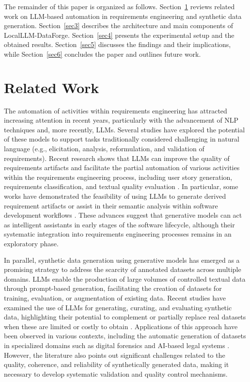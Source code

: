 \documentclass[pdflatex,sn-mathphys-num]{sn-jnl}%
\theoremstyle{thmstyleone}%
\theoremstyle{thmstyletwo}%
\theoremstyle{thmstylethree}%
\begin{document}
The remainder of this paper is organized as follows. Section~\ref{sec2} reviews related work on LLM-based automation in requirements engineering and synthetic data generation. Section~\ref{sec3} describes the architecture and main components of LocalLLM-DataForge. Section~\ref{sec4} presents the experimental setup and the obtained results. Section~\ref{sec5} discusses the findings and their implications, while Section~\ref{sec6} concludes the paper and outlines future work.

\section{Related Work}\label{sec2}

The automation of activities within requirements engineering has attracted increasing attention in recent years, particularly with the advancement of NLP techniques and, more recently, LLMs. Several studies have explored the potential of these models to support tasks traditionally considered challenging in natural language (e.g., elicitation, analysis, reformulation, and validation of requirements). Recent research shows that LLMs can improve the quality of requirements artifacts and facilitate the partial automation of various activities within the requirements engineering process, including user story generation, requirements classification, and textual quality evaluation \cite{hematt2025, zadenoori2025}. In particular, some works have demonstrated the feasibility of using LLMs to generate derived requirement artifacts or assist in their semantic analysis within software development workflows \cite{sami2024, proci2025}. These advances suggest that generative models can act as intelligent assistants in early stages of the software lifecycle, although their systematic integration into requirements engineering processes remains in an exploratory phase.

In parallel, synthetic data generation using generative models has emerged as a promising strategy to address the scarcity of annotated datasets across multiple domains. LLMs enable the production of large volumes of controlled textual data through prompt-based generation, facilitating the creation of datasets for training, evaluation, or augmentation of existing data. Recent studies have examined the use of LLMs for generating, curating, and evaluating synthetic data, highlighting their potential to complement or partially replace real datasets when these are limited or costly to obtain \cite{long2024}. Applications of this approach have been observed in various contexts, including the automatic generation of datasets in specialized domains such as digital forensics and AI-based legal systems \cite{fsidi2025, ma2025}. However, the literature also points out significant challenges related to the quality, coherence, and reliability of synthetically generated data, making it necessary to develop systematic validation and quality control mechanisms.
\end{document}
